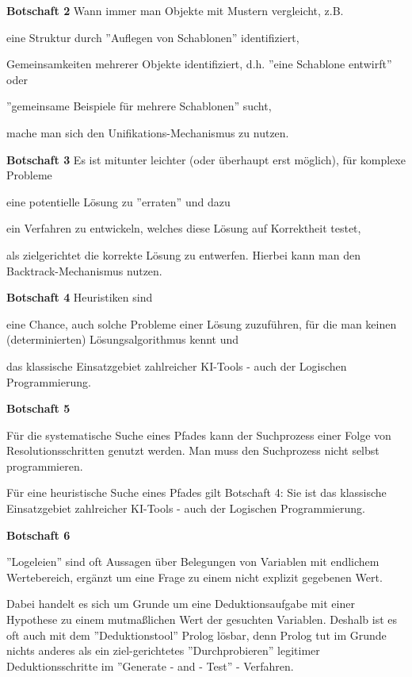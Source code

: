 \documentclass[a4paper]{article}
\renewcommand{\note}[2]{\begin{noteBox} \textbf{#1} #2 \end{noteBox}}
\begin{document}
\begin{multicols}{3}
  \note{Botschaft 2}{Wann immer man Objekte mit Mustern vergleicht, z.B.
    \begin{enumerate*}
      \item eine Struktur durch ''Auflegen von Schablonen'' identifiziert,
      \item Gemeinsamkeiten mehrerer Objekte identifiziert, d.h. ''eine Schablone entwirft'' oder
      \item ''gemeinsame Beispiele für mehrere Schablonen'' sucht,
    \end{enumerate*}
    mache man sich den Unifikations-Mechanismus zu nutzen.}

  \note{Botschaft 3}{Es ist mitunter leichter (oder überhaupt erst möglich), für komplexe Probleme
    \begin{enumerate*}
      \item eine potentielle Lösung zu ''erraten'' und dazu
      \item ein Verfahren zu entwickeln, welches diese Lösung auf Korrektheit testet,
    \end{enumerate*}
    als zielgerichtet die korrekte Lösung zu entwerfen. Hierbei kann man den Backtrack-Mechanismus nutzen.}

  \note{Botschaft 4}{Heuristiken sind
    \begin{enumerate*}
      \item eine Chance, auch solche Probleme einer Lösung zuzuführen, für die man keinen (determinierten) Lösungsalgorithmus kennt und
      \item das klassische Einsatzgebiet zahlreicher KI-Tools - auch der Logischen Programmierung.
    \end{enumerate*}
  }

  \note{Botschaft  5}{
    \begin{enumerate*}
      \item Für die systematische Suche eines Pfades kann der Suchprozess einer Folge von Resolutionsschritten genutzt werden. Man muss den Suchprozess nicht selbst programmieren.
    \item Für eine heuristische Suche eines Pfades gilt Botschaft 4: Sie ist das klassische Einsatzgebiet zahlreicher KI-Tools - auch der Logischen Programmierung.
    \end{enumerate*}
  }

  \note{Botschaft 6}{
    \begin{enumerate*}
      \item ''Logeleien'' sind oft Aussagen über Belegungen von Variablen mit endlichem Wertebereich, ergänzt um eine Frage zu einem nicht explizit gegebenen Wert.
      \item Dabei handelt es sich um Grunde um eine Deduktionsaufgabe mit einer Hypothese zu einem mutmaßlichen Wert der gesuchten Variablen. Deshalb ist es oft auch mit dem ''Deduktionstool'' Prolog lösbar, denn Prolog tut im Grunde nichts anderes als ein ziel-gerichtetes ''Durchprobieren'' legitimer Deduktionsschritte im ''Generate - and - Test'' - Verfahren.
    \end{enumerate*}
  }


\end{multicols}
\end{document}
